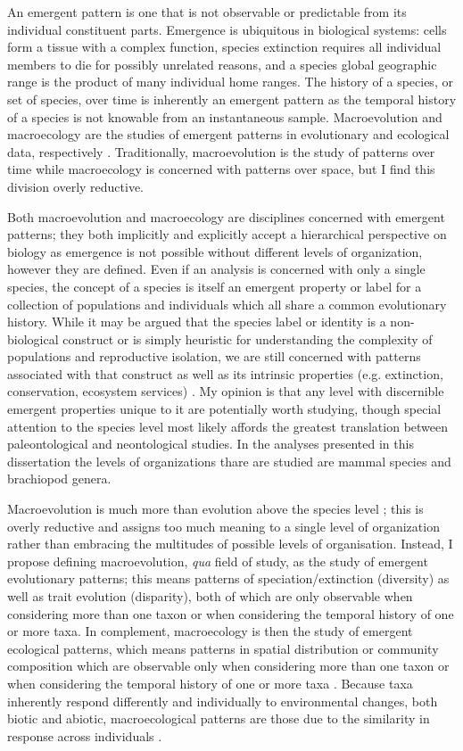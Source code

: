 An emergent pattern is one that is not observable or predictable from its individual constituent parts. Emergence is ubiquitous in biological systems: cells form a tissue with a complex function, species extinction requires all individual members to die for possibly unrelated reasons, and a species global geographic range is the product of many individual home ranges. The history of a species, or set of species, over time is inherently an emergent pattern as the temporal history of a species is not knowable from an instantaneous sample. Macroevolution and macroecology are the studies of emergent patterns in evolutionary and ecological data, respectively \citep{Brown1989,Brown1995,Stanley1979,Stanley1975}. Traditionally, macroevolution is the study of patterns over time while macroecology is concerned with patterns over space, but I find this division overly reductive.

Both macroevolution and macroecology are disciplines concerned with emergent patterns; they both implicitly and explicitly accept a hierarchical perspective on biology as emergence is not possible without different levels of organization, however they are defined. Even if an analysis is concerned with only a single species, the concept of a species is itself an emergent property or label for a collection of populations and individuals which all share a common evolutionary history. While it may be argued that the species label or identity is a non-biological construct or is simply heuristic for understanding the complexity of populations and reproductive isolation, we are still concerned with patterns associated with that construct as well as its intrinsic properties (e.g. extinction, conservation, ecosystem services) \citep{Coyne2004,Jablonski2008a}. My opinion is that any level with discernible emergent properties unique to it are potentially worth studying, though special attention to the species level most likely affords the greatest translation between paleontological and neontological studies. In the analyses presented in this dissertation the levels of organizations thare are studied are mammal species and brachiopod genera.

Macroevolution is much more than evolution above the species level \citep{Foote2007b}; this is overly reductive and assigns too much meaning to a single level of organization rather than embracing the multitudes of possible levels of organisation. Instead, I propose defining macroevolution, \textit{qua} field of study, as the study of emergent evolutionary patterns; this means patterns of speciation/extinction (diversity) as well as trait evolution (disparity), both of which are only observable when considering more than one taxon or when considering the temporal history of one or more taxa. In complement, macroecology is then the study of emergent ecological patterns, which means patterns in spatial distribution or community composition which are observable only when considering more than one taxon or when considering the temporal history of one or more taxa \citep{Brown1989,Brown1995,Smith2008b}. Because taxa inherently respond differently and individually to environmental changes, both biotic and abiotic, macroecological patterns are those due to the similarity in response across individuals \citep{Blois2009}.

